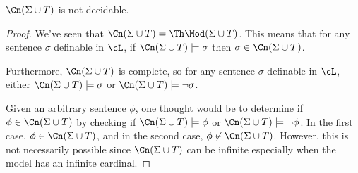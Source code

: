 \begin{corollary}
  $\Cn (\Sigma \cup T)$ is not decidable.

  \begin{proof}
    We've seen that $\Cn (\Sigma \cup T) = \Th \Mod (\Sigma \cup T)$.
    This means that for any sentence $\sigma$ definable in $\cL$,
    if $\Cn (\Sigma \cup T) \models \sigma$ then 
    $\sigma \in \Cn (\Sigma \cup T)$.
    
    Furthermore, $\Cn (\Sigma \cup T)$ is complete,
    so for any sentence $\sigma$ definable in $\cL$,
    either $\Cn (\Sigma \cup T) \models \sigma$ or
    $\Cn (\Sigma \cup T) \models \neg \sigma$.

    Given an arbitrary sentence $\phi$, one thought would be to determine if
    $\phi \in \Cn (\Sigma \cup T)$ by checking if $\Cn (\Sigma \cup T) \models \phi$ or $\Cn (\Sigma \cup T) \models \neg \phi$.
    In the first case, $\phi \in \Cn (\Sigma \cup T)$, and in the second case,
    $\phi \notin \Cn (\Sigma \cup T)$.
    However, this is not necessarily possible since $\Cn (\Sigma \cup T)$ can be infinite
    especially when the model has an infinite cardinal.
  \end{proof}
\end{corollary}

